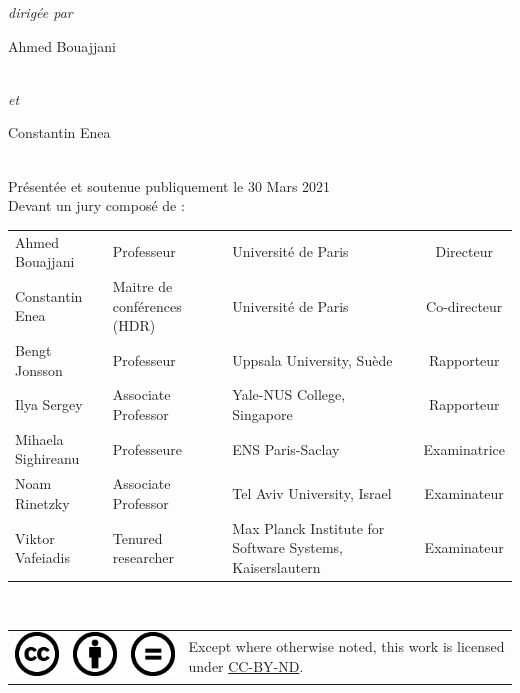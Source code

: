 \begin{titlepage}
\begin{center}
    \emph{dirigée par}\\
    \vspace{0.1cm}
    \begin{Large}Ahmed Bouajjani\end{Large}\\
    \emph{et}\\
    \begin{Large}Constantin Enea\end{Large}\\
    \vspace{0.5cm}
    Présentée et soutenue publiquement le 30 Mars 2021\\
    \vspace{0.1cm}
    Devant un jury composé de :\\
    \vspace{0.5cm}
    \begin{tabular}{lp{9em}p{12em}c}
    Ahmed Bouajjani & Professeur & Université de Paris & Directeur\\
    Constantin Enea & Maitre de conférences (HDR) & Université de Paris & Co-directeur\\
    Bengt Jonsson & Professeur & Uppsala University, Suède & Rapporteur\\
    Ilya Sergey & Associate Professor & Yale-NUS College, Singapore & Rapporteur\\
    Mihaela Sighireanu & Professeure & ENS Paris-Saclay & Examinatrice\\
    Noam Rinetzky & Associate Professor & Tel Aviv University, Israel & Examinateur\\
    Viktor Vafeiadis & Tenured researcher & Max Planck Institute for Software Systems, Kaiserslautern & Examinateur\\
    \end{tabular}\\
    \vfill
    \begin{tabular}{cccb{12em}}
      \includegraphics[scale=.5]{assets/cc.png} & \includegraphics[scale=.5]{assets/by.png} & \includegraphics[scale=.5]{assets/nd.png} & Except where otherwise noted, this work is licensed under \href{https://creativecommons.org/licenses/by-nd/4.0}{CC-BY-ND}.\\
    \end{tabular}
  \end{center}
  \makeatother
\end{titlepage}
\newpage
\null
\thispagestyle{empty}
\newpage
